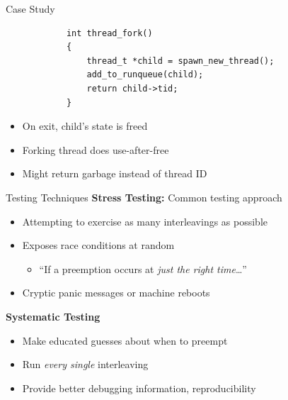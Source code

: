 \documentclass[xcolor=dvipsnames]{beamer}
\begin{document}
\begin{frame}[fragile]{Case Study}
	\begin{center}
	\begin{verbatim}
	        int thread_fork()
	        {
	            thread_t *child = spawn_new_thread();
	            add_to_runqueue(child);
	            return child->tid;
	        }
	\end{verbatim}
	\end{center}

	\begin{itemize}
		\item On exit, child's state is freed
		\item Forking thread does use-after-free
		\item Might return garbage instead of thread ID
	\end{itemize}
\end{frame}

\begin{frame}{Testing Techniques} %
	\textbf{Stress Testing:} Common testing approach
	\begin{itemize}
		\item Attempting to exercise as many interleavings as possible
		\item Exposes race conditions at random
		\begin{itemize}
			\item ``If a preemption occurs at {\em just the right time}\dots''
		\end{itemize}
		\item Cryptic panic messages or machine reboots
	\end{itemize}
	\linegap

	{\bf Systematic Testing} 
	\begin{itemize}
		\item Make educated guesses about when to preempt
		\item Run {\em every single} interleaving
		\item Provide better debugging information, reproducibility
	\end{itemize}
\end{frame}
\end{document}
